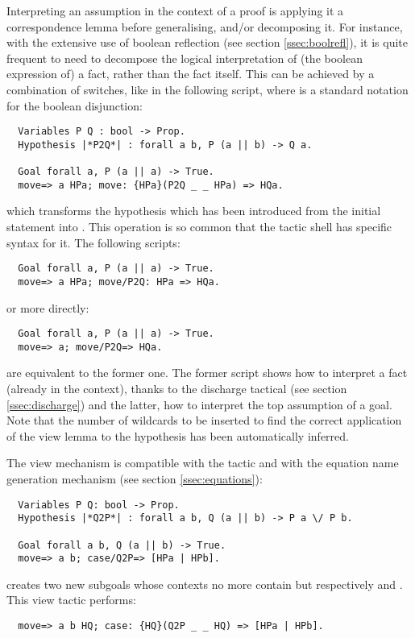 Interpreting an assumption in the context of a proof is applying it a
correspondence lemma before generalising, and/or decomposing it.
For instance, with the extensive use of boolean reflection (see
section \ref{ssec:boolrefl}), it is
quite frequent to need to decompose the logical interpretation of (the
boolean expression of) a
fact, rather than the fact itself.
This can be achieved by a combination of 
switches, like in the following script, where \C{||} is a standard
  \Coq{} notation for the boolean disjunction:
\begin{lstlisting}
  Variables P Q : bool -> Prop.
  Hypothesis |*P2Q*| : forall a b, P (a || b) -> Q a.

  Goal forall a, P (a || a) -> True.
  move=> a HPa; move: {HPa}(P2Q _ _ HPa) => HQa.
\end{lstlisting}
which transforms the hypothesis  which has been
introduced from the initial statement into .
This operation is so common that the tactic shell has
specific syntax for it.
The following scripts:
\begin{lstlisting}
  Goal forall a, P (a || a) -> True.
  move=> a HPa; move/P2Q: HPa => HQa.
\end{lstlisting}
or more directly:
\begin{lstlisting}
  Goal forall a, P (a || a) -> True.
  move=> a; move/P2Q=> HQa.
\end{lstlisting}
are equivalent to the former one. The former script shows how to
interpret a fact (already in the context), thanks to the discharge
tactical (see section \ref{ssec:discharge}) and the latter, how to
interpret the top assumption of a goal. Note
that the number of wildcards to be inserted to find the correct
application of the view lemma to the hypothesis has been automatically
inferred.

The view mechanism is compatible with the  tactic and with the
equation name generation mechanism (see section \ref{ssec:equations}):
\begin{lstlisting}
  Variables P Q: bool -> Prop.
  Hypothesis |*Q2P*| : forall a b, Q (a || b) -> P a \/ P b.

  Goal forall a b, Q (a || b) -> True.
  move=> a b; case/Q2P=> [HPa | HPb].
\end{lstlisting}
creates two new subgoals whose contexts no more contain
 but respectively  and
. This view tactic
performs:
\begin{lstlisting}
  move=> a b HQ; case: {HQ}(Q2P _ _ HQ) => [HPa | HPb].
\end{lstlisting}

